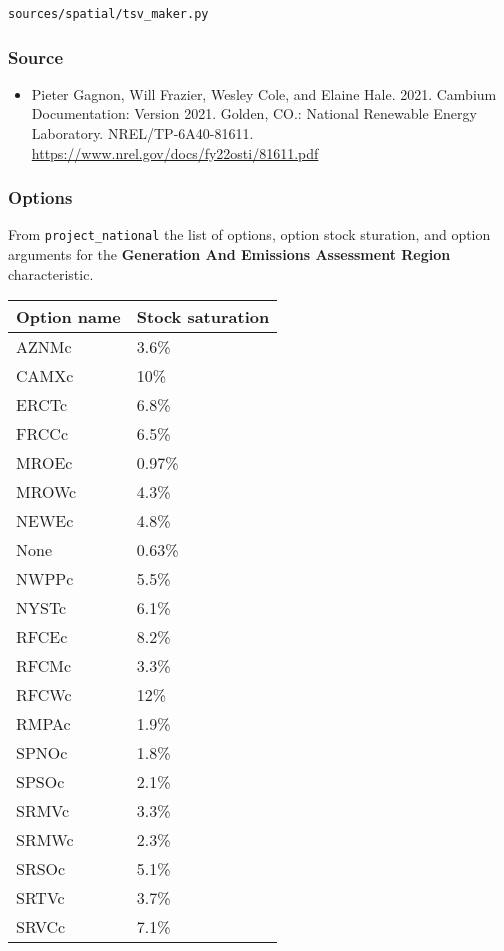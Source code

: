 \texttt{sources/spatial/tsv\_maker.py}

\subsubsection{Source}\label{source-41}

\begin{itemize}
 
\item
  Pieter Gagnon, Will Frazier, Wesley Cole, and Elaine Hale. 2021.
  Cambium Documentation: Version 2021. Golden, CO.: National Renewable
  Energy Laboratory. NREL/TP-6A40-81611.
  \url{https://www.nrel.gov/docs/fy22osti/81611.pdf}
\end{itemize}

\subsubsection{Options}\label{options-42}

From \texttt{project\_national} the list of options, option stock
sturation, and option arguments for the \textbf{Generation And Emissions
Assessment Region} characteristic.

\begin{longtable}[]{@{}ll@{}}
\toprule\noalign{}
Option name & Stock saturation \\
\midrule\noalign{}
\endhead
\bottomrule\noalign{}
\endlastfoot
AZNMc & 3.6\% \\
CAMXc & 10\% \\
ERCTc & 6.8\% \\
FRCCc & 6.5\% \\
MROEc & 0.97\% \\
MROWc & 4.3\% \\
NEWEc & 4.8\% \\
None & 0.63\% \\
NWPPc & 5.5\% \\
NYSTc & 6.1\% \\
RFCEc & 8.2\% \\
RFCMc & 3.3\% \\
RFCWc & 12\% \\
RMPAc & 1.9\% \\
SPNOc & 1.8\% \\
SPSOc & 2.1\% \\
SRMVc & 3.3\% \\
SRMWc & 2.3\% \\
SRSOc & 5.1\% \\
SRTVc & 3.7\% \\
SRVCc & 7.1\% \\
\end{longtable}

